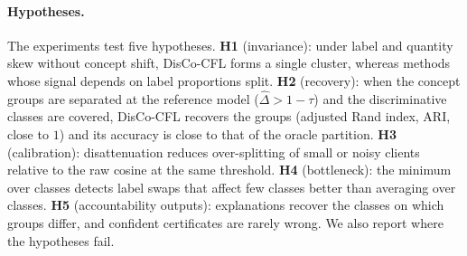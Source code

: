 \documentclass[pdflatex,sn-apa]{sn-jnl}
\theoremstyle{thmstyleone}
\theoremstyle{thmstylethree}
\begin{document}
\paragraph{Hypotheses.} The experiments test five hypotheses. \textbf{H1} (invariance): under label and quantity skew without concept shift, DisCo-CFL forms a single cluster, whereas methods whose signal depends on label proportions split. \textbf{H2} (recovery): when the concept groups are separated at the reference model ($\hat\Delta>1-\tau$) and the discriminative classes are covered, DisCo-CFL recovers the groups (adjusted Rand index, ARI, close to $1$) and its accuracy is close to that of the oracle partition. \textbf{H3} (calibration): disattenuation reduces over-splitting of small or noisy clients relative to the raw cosine at the same threshold. \textbf{H4} (bottleneck): the minimum over classes detects label swaps that affect few classes better than averaging over classes. \textbf{H5} (accountability outputs): explanations recover the classes on which groups differ, and confident certificates are rarely wrong. We also report where the hypotheses fail.
\end{document}
